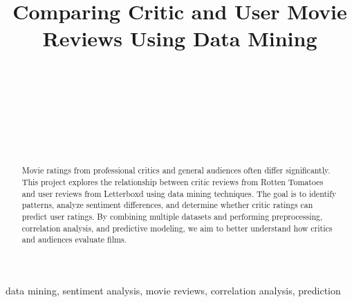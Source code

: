\documentclass[conference]{IEEEtran}
\begin{document}
\title{Comparing Critic and User Movie Reviews Using Data Mining}


\author{
   \\

  \and
   \\

  \and
   \\

  \and
   \\
}

\maketitle

\begin{abstract}
  Movie ratings from professional critics and general audiences often differ significantly.
  This project explores the relationship between critic reviews from Rotten Tomatoes and
  user reviews from Letterboxd using data mining techniques. The goal is to identify patterns,
  analyze sentiment differences, and determine whether critic ratings can predict user ratings.
  By combining multiple datasets and performing preprocessing, correlation analysis, and
  predictive modeling, we aim to better understand how critics and audiences evaluate films.
\end{abstract}

\begin{IEEEkeywords}
  data mining, sentiment analysis, movie reviews, correlation analysis, prediction
\end{IEEEkeywords}
\end{document}
